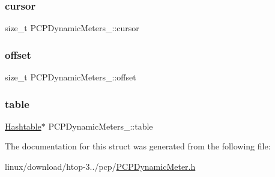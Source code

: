\subsubsection{\texorpdfstring{cursor}{cursor}}
{\footnotesize\ttfamily size\+\_\+t P\+C\+P\+Dynamic\+Meters\+\_\+\+::cursor}

\mbox{\label{structPCPDynamicMeters___a59b644e112a64b105ac0eed90c1e44e8}} 
\subsubsection{\texorpdfstring{offset}{offset}}
{\footnotesize\ttfamily size\+\_\+t P\+C\+P\+Dynamic\+Meters\+\_\+\+::offset}

\mbox{\label{structPCPDynamicMeters___af6c7c9dc413717d0f516097990595150}} 
\subsubsection{\texorpdfstring{table}{table}}
{\footnotesize\ttfamily \hyperlink{Hashtable_8h_af67f943dab16c5d7d465c18053edf47f}{Hashtable}$\ast$ P\+C\+P\+Dynamic\+Meters\+\_\+\+::table}



The documentation for this struct was generated from the following file\+:\begin{DoxyCompactItemize}
\item 
linux/download/htop-\/3../pcp/\hyperlink{PCPDynamicMeter_8h}{P\+C\+P\+Dynamic\+Meter.\+h}\end{DoxyCompactItemize}
